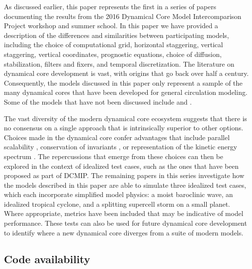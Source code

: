 \documentclass[gmd, manuscript]{copernicus}
\begin{document}

 \label{sec:Conclusions}  %

As discussed earlier, this paper represents the first in a series of papers documenting the results from the 2016 Dynamical Core Model Intercomparison Project workshop and summer school.  In this paper we have provided a description of the differences and similarities between participating models, including the choice of computational grid, horizontal staggering, vertical staggering, vertical coordinates, prognostic equations, choice of diffusion, stabilization, filters and fixers, and temporal discretization.  The literature on dynamical core development is vast, with origins that go back over half a century.  Consequently, the models discussed in this paper only represent a sample of the many dynamical cores that have been developed for general circulation modeling.  Some of the models that have not been discussed include \cite{fox1997finite, prusa2008eulag, nair2009computational, baba2010dynamical, donner2011dynamical, ullrich2012mcore, gassmann2013global, wood2014inherently} and \cite{doyle2014next}.

The vast diversity of the modern dynamical core ecosystem suggests that there is no consensus on a single approach that is intrinsically superior to other options.  Choices made in the dynamical core confer advantages that include parallel scalability \citep{dennis2012cam}, conservation of invariants \citep{thuburn2008some}, or representation of the kinetic energy spectrum \citep{skamarock2004evaluating}.  The repercussions that emerge from these choices can then be explored in the context of idealized test cases, such as the ones that have been proposed as part of DCMIP.  The remaining papers in this series investigate how the models described in this paper are able to simulate three idealized test cases, which each incorporate simplified model physics:  a moist baroclinic wave, an idealized tropical cyclone, and a splitting supercell storm on a small planet.  Where appropriate, metrics have been included that may be indicative of model performance.  These tests can also be used for future dynamical core development to identify where a new dynamical core diverges from a suite of modern models.

\subsection*{Code availability}
\end{document}

